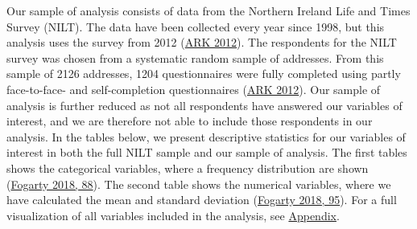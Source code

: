 \documentclass[
]{article}
\begin{document}
Our sample of analysis consists of data from the Northern Ireland Life
and Times Survey (NILT). The data have been collected every year since
1998, but this analysis uses the survey from 2012
(\protect\hyperlink{ref-ark_2012}{ARK 2012}). The respondents for the
NILT survey was chosen from a systematic random sample of addresses.
From this sample of 2126 addresses, 1204 questionnaires were fully
completed using partly face-to-face- and self-completion questionnaires
(\protect\hyperlink{ref-ark_2012}{ARK 2012}). Our sample of analysis is
further reduced as not all respondents have answered our variables of
interest, and we are therefore not able to include those respondents in
our analysis. In the tables below, we present descriptive statistics for
our variables of interest in both the full NILT sample and our sample of
analysis. The first tables shows the categorical variables, where a
frequency distribution are shown
(\protect\hyperlink{ref-fogarty2018quantitative}{Fogarty 2018, 88}). The
second table shows the numerical variables, where we have calculated the
mean and standard deviation
(\protect\hyperlink{ref-fogarty2018quantitative}{Fogarty 2018, 95}). For
a full visualization of all variables included in the analysis, see
\protect\hyperlink{appendix}{Appendix}.
\end{document}
